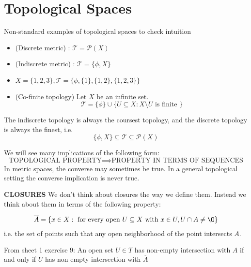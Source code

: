 \setcounter{chapter}{0}
\chapter{Topological Spaces}
Non-standard examples of topological spaces to check intuition
\begin{itemize}
    \item (Discrete metric) : $  \mathcal{T}= \mathcal{P}(X)$
    \item (Indiscrete metric) : $\mathcal{T} = \{\phi, X\} $
    \item $X = \{1, 2, 3\} , \mathcal{T}=\{\phi, \{1\} , \{1, 2\}, \{1, 2, 3\}  \} $
    \item (Co-finite topology) Let $X$ be an infinite set. 
        \[
    \mathcal{T} = \{\phi\} \cup \{U \subseteq X : X \setminus U \text{ is finite }  \} 
        \] 
\end{itemize}
The indiscrete topology is always the coursest topology, and the discrete topology is always the finest, i.e. 
\[
    \{\phi, X\} \subseteq \mathcal{T} \subseteq \mathcal{P}(X)
\] 
\begin{remark}
    We will see many implications of the following form:
    \[
    \text{TOPOLOGICAL PROPERTY} \implies \text{PROPERTY IN TERMS OF SEQUENCES}
    \] 
    In metric spaces, the converse may sometimes be true. In a general topological setting the converse implication is never true.
\end{remark}

\textbf{CLOSURES}
We don't think about closures the way we define them. Instead we think about them in terms of the following property:
\begin{prop}
    $$\overline{A} = \{x \in  X : \text{ for every open } U \subseteq X \text{ with }x \in  U, U \cap A \neq  \O \} $$
    i.e. the set of points such that any open neighborhood of the point intersects $A$. 
\end{prop}

From sheet 1 exercise 9:
An open set $U \in T$ has non-empty intersection with $A$ if and only if $U$ has non-empty intersection with $\overline{A}$

